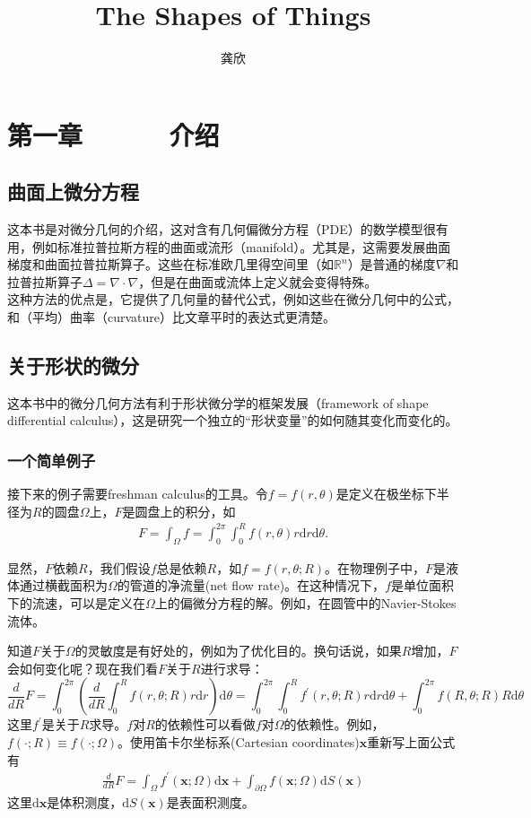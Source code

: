 \documentclass[12pt,a4paper]{article}
\title{The Shapes of Things}
\author{龚欣}
\date{\chntoday}
\numberwithin{equation}{section}
\begin{document}
\maketitle

\section{第一章~~~~~~介绍}
\subsection{曲面上微分方程}
这本书是对微分几何的介绍，这对含有几何偏微分方程（PDE）的数学模型很有用，例如标准拉普拉斯方程的曲面或流形（manifold）。尤其是，这需要发展曲面梯度和曲面拉普拉斯算子。这些在标准欧几里得空间里（如$\mathbb{R}^n$）是普通的梯度$\nabla$和拉普拉斯算子$\Delta =\nabla \cdot \nabla$，但是在曲面或流体上定义就会变得特殊。\\

这种方法的优点是，它提供了几何量的替代公式，例如这些在微分几何中的公式，和（平均）曲率（curvature）比文章平时的表达式更清楚。

\subsection{关于形状的微分}
这本书中的微分几何方法有利于形状微分学的框架发展（framework of shape differential calculus），这是研究一个独立的“形状变量”的如何随其变化而变化的。

\subsubsection{一个简单例子}
接下来的例子需要freshman calculus的工具。令$f=f(r,\theta)$是定义在极坐标下半径为$R$的圆盘$\Omega$上，$F$是圆盘上的积分，如
\begin{gather}
F=\int_{\Omega} f=\int_{0}^{2\pi}\int_{0}^{R} f(r,\theta)r\mathrm{d}r\mathrm{d}\theta.
\end{gather}

显然，$F$依赖$R$，我们假设$f$总是依赖$R$，如$f=f(r,\theta;R)$。在物理例子中，$F$是液体通过横截面积为$\Omega$的管道的净流量(net flow rate)。在这种情况下，$f$是单位面积下的流速，可以是定义在$\Omega$上的偏微分方程的解。例如，在圆管中的Navier-Stokes流体。

知道$F$关于$\Omega$的灵敏度是有好处的，例如为了优化目的。换句话说，如果$R$增加，$F$会如何变化呢？现在我们看$F$关于$R$进行求导：
$$\frac{d}{dR}F=\int_{0}^{2\pi}\left( \frac{d}{dR}\int_{0}^{R}f(r,\theta;R)r\mathrm{d}r \right)\mathrm{d}\theta =\int_{0}^{2\pi}\int_{0}^{R}f^{'}(r,\theta;R)r\mathrm{d}r\mathrm{d}\theta + \int_{0}^{2\pi}f(R,\theta;R)R\mathrm{d}\theta$$
这里$f^{'}$是关于$R$求导。$f$对$R$的依赖性可以看做$f$对$\Omega$的依赖性。例如，$f(\cdot;R)\equiv f(\cdot;\Omega)$。使用笛卡尔坐标系(Cartesian coordinates)$\mathbf{x}$重新写上面公式有
\begin{gather}
\frac{d}{dR}F=\int_{\Omega}f^{'}(\mathbf{x};\Omega)\mathrm{d}\mathbf{x} + \int_{\partial \Omega}f(\mathbf{x};\Omega)\mathrm{d}S(\mathbf{x})
\end{gather}
这里$\mathrm{d}\mathbf{x}$是体积测度，$\mathrm{d}S(\mathbf{x})$是表面积测度。
\end{document}
